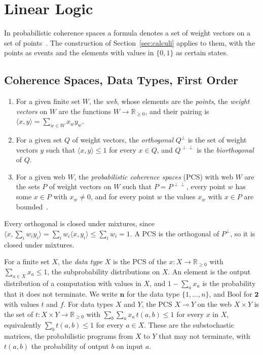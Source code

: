\section{Linear Logic}
\label{sec:linear}

In probabilistic coherence spaces a formula denotes a set of weight
vectors on a set of points~\cite{danos-ehrhard2011}. The construction of
Section~\ref{sec:calculi} applies to them, with the points as events and
the elements with values in $\{0,1\}$ as certain states.

\subsection{Coherence Spaces, Data Types, First Order}
\label{sec:linear-first}

\begin{definition}
\label{def:pcs}
\begin{enumerate}
  \item[(i)] For a given finite set $W$, the \emph{web}, whose elements are the
\emph{points}, the \emph{weight vectors} on $W$ are the functions
  $W \to \mathbb{R}_{\ge 0}$, and their pairing is
  $\langle x, y \rangle = \sum_{w \in W} x_w y_w$.
  \item[(ii)] For a given set $Q$ of weight vectors, the \emph{orthogonal}
  $Q^{\perp}$ is the set of weight vectors $y$ such that
  $\langle x, y \rangle \le 1$ for every $x \in Q$, and $Q^{\perp\perp}$
  is the \emph{biorthogonal} of $Q$.
  \item[(iii)] For a given web $W$, the \emph{probabilistic coherence
  spaces} (PCS) with web $W$ are the sets $P$ of weight vectors on $W$
  such that $P = P^{\perp\perp}$, every point $w$ has some $x \in P$ with
  $x_w \ne 0$, and for every point $w$ the values $x_w$ with $x \in P$
  are bounded~\cite{danos-ehrhard2011}.
\end{enumerate}
\end{definition}

\noindent
Every orthogonal is closed under mixtures, since
$\langle x, \sum_i w_i y_i \rangle = \sum_i w_i \langle x, y_i \rangle \le
\sum_i w_i = 1$. A PCS is the orthogonal of
$P^{\perp}$, so it is closed under mixtures.

For a finite set $X$, the \emph{data type} $X$ is the PCS of the
$x : X \to \mathbb{R}_{\ge 0}$ with $\sum_{a \in X} x_a \le 1$, the
subprobability distributions on $X$. An element is
the output distribution of a computation with values in $X$, and
$1 - \sum_a x_a$ is the probability that it does not terminate. We write
$\mathbf{n}$ for the data type $\{1, \dots, n\}$, and $\mathrm{Bool}$ for
$\mathbf{2}$ with values $t$ and $f$. For data types $X$ and $Y$, the PCS
$X \multimap Y$ on the web $X \times Y$ is the set of
$t : X \times Y \to \mathbb{R}_{\ge 0}$ with
$\sum_{b} \sum_{a} x_a\, t(a,b) \le 1$ for every $x$ in $X$, equivalently
$\sum_{b} t(a,b) \le 1$ for every $a \in X$. These
are the substochastic matrices, the probabilistic programs from $X$ to
$Y$ that may not terminate, with $t(a,b)$ the probability of output $b$
on input $a$.

